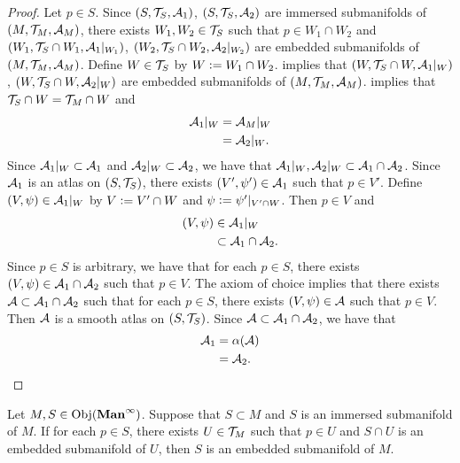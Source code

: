 \documentclass{book}
\begin{document}
	\begin{proof}
		Let $p \in S$. Since $(S, \mathcal{T}_S, \mathcal{A}_1)$, $(S, \mathcal{T}_S, \mathcal{A}_2)$ are immersed submanifolds of $(M, \mathcal{T}_M, \mathcal{A}_M)$, there exists $W_1, W_2 \in \mathcal{T}_S$ such that $p \in W_1 \cap W_2$ and $(W_1, \mathcal{T}_S \cap W_1, \mathcal{A}_1|_{W_1})$, $(W_2, \mathcal{T}_S \cap W_2, \mathcal{A}_2|_{W_2})$ are embedded submanifolds of $(M, \mathcal{T}_M, \mathcal{A}_M)$. Define $W \in \mathcal{T}_S$ by $W \vcentcolon= W_1 \cap W_2$.   implies that $(W, \mathcal{T}_S \cap W, \mathcal{A}_1|_W)$, $(W, \mathcal{T}_S \cap W, \mathcal{A}_2|_W)$ are embedded submanifolds of $(M, \mathcal{T}_M, \mathcal{A}_M)$. \rex{}  implies that $\mathcal{T}_S \cap W = \mathcal{T}_M \cap W$ and 
		\begin{align*}
			\mathcal{A}_1|_W
			& = \mathcal{A}_M|_W \\
			& = \mathcal{A}_2|_W.
		\end{align*}
		Since $\mathcal{A}_1|_W \subset \mathcal{A}_1$ and $\mathcal{A}_2|_W \subset \mathcal{A}_2$, we have that $\mathcal{A}_1|_W, \mathcal{A}_2|_W \subset \mathcal{A}_1 \cap \mathcal{A}_2$. Since $\mathcal{A}_1$ is an atlas on $(S, \mathcal{T}_S)$, there exists $(V', \psi') \in \mathcal{A}_1$ such that $p \in V'$. Define $(V, \psi) \in \mathcal{A}_1|_W$ by $V \vcentcolon= V' \cap W$ and $\psi \vcentcolon= \psi'|_{V' \cap W}$. Then $p \in V$ and
		\begin{align*}
			(V, \psi) 
			& \in \mathcal{A}_1|_W \\
			& \subset \mathcal{A}_1 \cap \mathcal{A}_2.
		\end{align*}
		Since $p \in S$ is arbitrary, we have that for each $p \in S$, there exists $(V, \psi) \in \mathcal{A}_1 \cap \mathcal{A}_2$ such that $p \in V$. The axiom of choice implies that there exists $\mathcal{A} \subset \mathcal{A}_1 \cap \mathcal{A}_2$ such that for each $p \in S$, there exists $(V, \psi) \in \mathcal{A}$ such that $p \in V$. Then $\mathcal{A}$ is a smooth atlas on $(S, \mathcal{T}_S)$. Since $\mathcal{A} \subset \mathcal{A}_1 \cap \mathcal{A}_2$, we have that 
		\begin{align*}
			\mathcal{A}_1
			& = \alpha(\mathcal{A}) \\
			& = \mathcal{A}_2.
		\end{align*}
	\end{proof}

	\begin{ex}
		Let $M, S \in \operatorname{Obj}(\operatorname*{\text{\textbf{Man}}^{\infty}})$. Suppose that $S \subset M$ and $S$ is an immersed submanifold of $M$. If for each $p \in S$, there exists $U \in \mathcal{T}_M$ such that $p \in U$ and $S \cap U$ is an embedded submanifold of $U$, then $S$ is an embedded submanifold of $M$. 
	\end{ex}
	
\end{document}
